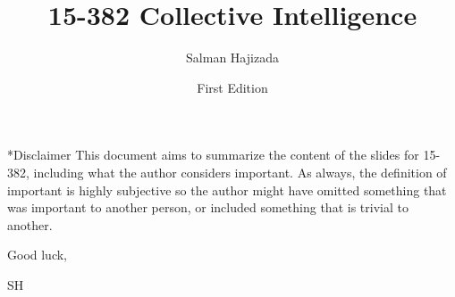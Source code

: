 \documentclass{report}
\title{15-382 Collective Intelligence}
\date{First Edition}
\author{Salman Hajizada}
\makeatletter
\def\chapter{\@ifstar\@schapter\@chapter}
\def\@chapter#1{%
  \refstepcounter{chapter}%
  \addcontentsline{toc}{chapter}{\protect\numberline{\thechapter}#1}%
  \chaptermark{#1}%
  {\par\vspace{2em}\centering\LARGE\bfseries
   \textcolor{chaptergreen}{Chapter \thechapter\\#1}\par\vspace{1em}}%
}
\def\@schapter#1{%
  {\par\vspace{1em}\centering\LARGE\bfseries
   \textcolor{chaptergreen}{#1}\par\vspace{1em}}%
}
\makeatother
\begin{document}
\maketitle

\chapter*{Disclaimer}
This document aims to summarize the content of the slides for 15-382, including
what the author considers important. As always, the definition of important is
highly subjective so the author might have omitted something that was
important to another person, or included something that is trivial to another.


Good luck,

SH










\end{document}
